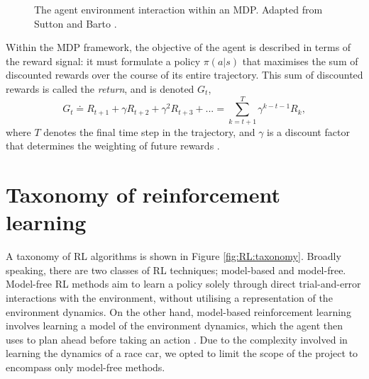 \begin{figure}[!htb]
\centering

\caption[The agent environment interaction within an MDP]{The agent environment interaction within an MDP. Adapted from Sutton and Barto \cite{sutton2020}. }
\label{fig:agent_env_boundary}
\end{figure}


Within the MDP framework, the objective of the agent is described in terms of the reward signal: it must formulate a policy $\pi(a|s)$ that maximises the sum of discounted rewards over the course of its entire trajectory.
This sum of discounted rewards is called the \emph{return}, and is denoted $G_t$,
\begin{equation}
G_t \doteq R_{t+1} + \gamma R_{t+2} + \gamma^2 R_{t+3} + ... = \sum_{k=t+1}^{T} \gamma^{k-t-1} R_{k},
\label{eq:G_t_discount}
\end{equation}
where $T$ denotes the final time step in the trajectory, and $\gamma$ is a discount factor that determines the weighting of future rewards \cite{sutton2020}.
















\section{Taxonomy of reinforcement learning}

A taxonomy of RL algorithms is shown in Figure \ref{fig:RL:taxonomy}.
Broadly speaking, there are two classes of RL techniques; model-based and model-free.
Model-free RL methods aim to learn a policy solely through direct trial-and-error interactions with the environment, without utilising a representation of the environment dynamics.
On the other hand, model-based reinforcement learning involves learning a model of the environment dynamics, which the agent then uses to plan ahead before taking an action \cite{wang2019benchmarking}.
Due to the complexity involved in learning the dynamics of a race car, we opted to limit the scope of the project to encompass only model-free methods.

